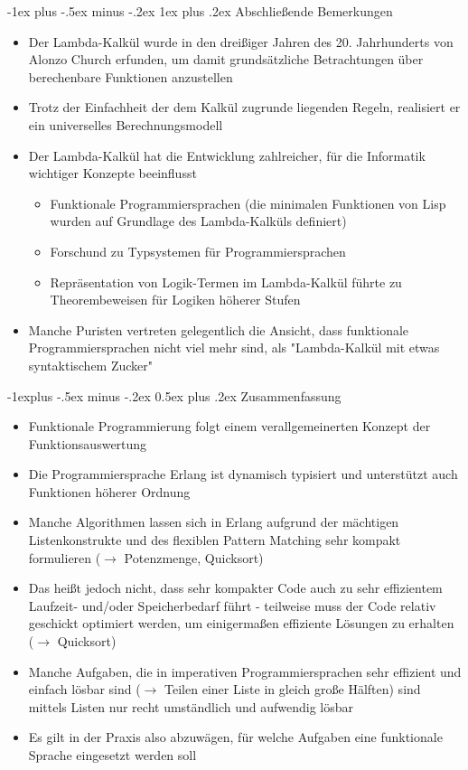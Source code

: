 \documentclass[10pt]{article}
\makeatletter
\renewcommand{\subsection}{\@startsection{subsection}{2}{0mm}%
                                {-1explus -.5ex minus -.2ex}%
                                {0.5ex plus .2ex}%
                                {\normalfont\normalsize\bfseries}}
\renewcommand{\subsubsection}{\@startsection{subsubsection}{3}{0mm}%
                                {-1ex plus -.5ex minus -.2ex}%
                                {1ex plus .2ex}%
                                {\normalfont\small\bfseries}}
\makeatother
\begin{document}
\subsubsection{Abschließende Bemerkungen}
\begin{itemize}
  \item Der Lambda-Kalkül wurde in den dreißiger Jahren des 20. Jahrhunderts von Alonzo Church erfunden, um damit grundsätzliche Betrachtungen über berechenbare Funktionen anzustellen
  \item Trotz der Einfachheit der dem Kalkül zugrunde liegenden Regeln, realisiert er ein universelles Berechnungsmodell
  \item Der Lambda-Kalkül hat die Entwicklung zahlreicher, für die Informatik wichtiger Konzepte beeinflusst
        \begin{itemize}
          \item Funktionale Programmiersprachen (die minimalen Funktionen von Lisp wurden auf Grundlage des Lambda-Kalküls definiert)
          \item Forschund zu Typsystemen für Programmiersprachen
          \item Repräsentation von Logik-Termen im Lambda-Kalkül führte zu Theorembeweisen für Logiken höherer Stufen
        \end{itemize}
  \item Manche Puristen vertreten gelegentlich die Ansicht, dass funktionale Programmiersprachen nicht viel mehr sind, als "Lambda-Kalkül mit etwas syntaktischem Zucker"
\end{itemize}

\subsection{Zusammenfassung}
\begin{itemize}
  \item Funktionale Programmierung folgt einem verallgemeinerten Konzept der Funktionsauswertung
  \item Die Programmiersprache Erlang ist dynamisch typisiert und unterstützt auch Funktionen höherer Ordnung
  \item Manche Algorithmen lassen sich in Erlang aufgrund der mächtigen Listenkonstrukte und des flexiblen Pattern Matching sehr kompakt formulieren ($\rightarrow$ Potenzmenge, Quicksort)
  \item Das heißt jedoch nicht, dass sehr kompakter Code auch zu sehr effizientem Laufzeit- und/oder Speicherbedarf führt - teilweise muss der Code relativ geschickt optimiert werden, um einigermaßen effiziente Lösungen zu erhalten ($\rightarrow$ Quicksort)
  \item Manche Aufgaben, die in imperativen Programmiersprachen sehr effizient und einfach lösbar sind ($\rightarrow$ Teilen einer Liste in gleich große Hälften) sind mittels Listen nur recht umständlich und aufwendig lösbar
  \item Es gilt in der Praxis also abzuwägen, für welche Aufgaben eine funktionale Sprache eingesetzt werden soll
\end{itemize}
\end{document}
